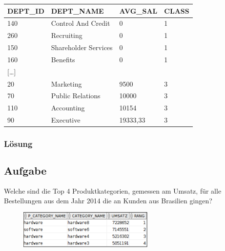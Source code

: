\begin{table}[H]
  \centering
  \begin{tabular}{|l|l|l|l|}
    \hline
    \textbf{DEPT\_ID} & \textbf{DEPT\_NAME}  & \textbf{AVG\_SAL} & \textbf{CLASS} \\
    \hline
    140               & Control And Credit   & 0                 & 1              \\
    260               & Recruiting           & 0                 & 1              \\
    150               & Shareholder Services & 0                 & 1              \\
    160               & Benefits             & 0                 & 1              \\
    $[$\dots$]$       &                      &                   &                \\
    20                & Marketing            & 9500              & 3              \\
    70                & Public Relations     & 10000             & 3              \\
    110               & Accounting           & 10154             & 3              \\
    90                & Executive            & 19333,33          & 3              \\
    \hline
  \end{tabular}
\end{table}

\subsubsection*{Lösung}
\label{subsubsec:uebung_07.aufgabe_02.loesung}


\label{subsec:uebung_07.aufgabe_03}
\subsection{Aufgabe}
Welche sind die Top 4 Produktkategorien, gemessen am Umsatz, für alle Bestellungen aus dem Jahr 2014 die an Kunden aus Brasilien gingen?

\begin{figure}[H]
  \centering
  \includegraphics[width=0.6\textwidth]{img//uebung_07_-_aufgabe_03.png}
  \label{img:uebung_07_-_aufgabe_03}
\end{figure}

